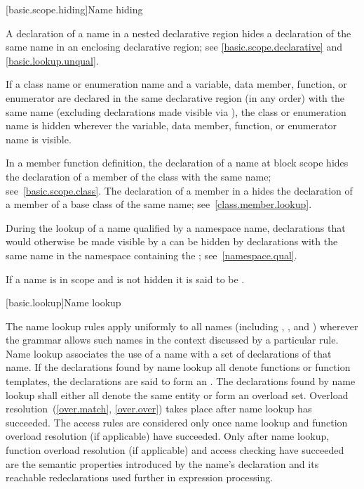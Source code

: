 [basic.scope.hiding]{Name hiding}

\pnum
{}%
%
%
A declaration of a name in a nested declarative region
hides a declaration of the same name in an enclosing declarative region;
see \ref{basic.scope.declarative} and \ref{basic.lookup.unqual}.

\pnum
{}%
If a class name or enumeration name and
a variable, data member, function, or enumerator
are declared in the same declarative region (in any order) with the
same name (excluding declarations made visible
via ),
the class or enumeration name is hidden wherever the variable, data member,
function, or enumerator name is visible.

\pnum
In a member function definition, the declaration of a name
at block scope
hides
the declaration of a member of the class with the same name;
see~\ref{basic.scope.class}. The declaration of a member in a  hides the declaration of a member of
a base class of the same name; see~\ref{class.member.lookup}.

\pnum
During the lookup of a name qualified by a namespace name, declarations
that would otherwise be made visible by a  can
be hidden by declarations with the same name in the namespace containing
the ; see~\ref{namespace.qual}.

\pnum
{}%
If a name is in scope and is not hidden it is said to be .%

[basic.lookup]{Name lookup}%
%
%

\pnum
The name lookup rules apply uniformly to all names (including
,
, and
) wherever the grammar allows
such names in the context discussed by a particular rule. Name lookup
associates the use of a name with a set of declarations of
that name.
If the declarations found by name lookup
all denote functions or function templates,
the declarations are said to form an .
The declarations found by name lookup shall either
all denote the same entity or form an overload set.
Overload resolution~(\ref{over.match}, \ref{over.over})
takes place after name lookup has succeeded. The access rules
are considered only once name lookup and
function overload resolution (if applicable) have succeeded. Only after
name lookup, function overload resolution (if applicable) and access
checking have succeeded
are the semantic properties introduced by the name's declaration
and its reachable redeclarations
used further in expression processing.

